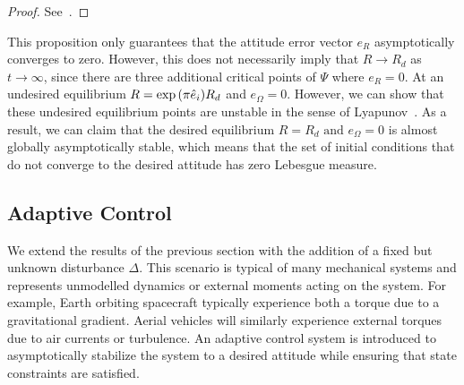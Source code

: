 \documentclass[letterpaper, 10 pt, conference]{ieeeconf}  %
\begin{document}
\begin{proof}
See~.
\end{proof}

This proposition only guarantees that the attitude error vector \( e_R \) asymptotically converges to zero.
However, this does not necessarily imply that \( R \to R_d \) as \( t \to \infty \), since there are three additional critical points of \( \Psi \) where \( e_R = 0 \).
At an undesired equilibrium \( R = \exp{ \ensuremath{\left( \pi \hat{e}_i \right)}} R_d \) and \( e_\Omega =0 \).
However, we can show that these undesired equilibrium points are unstable in the sense of Lyapunov~\cite{LeeITCST13}.
As a result, we can claim that the desired equilibrium \( R = R_d \text{ and } e_\Omega = 0 \) is almost globally asymptotically stable, which means that the set of initial conditions that do not converge to the desired attitude has zero Lebesgue measure.
 
\subsection{Adaptive Control}
We extend the results of the previous section with the addition of a fixed but unknown disturbance \( \Delta \).
This scenario is typical of many mechanical systems and represents unmodelled dynamics or external moments acting on the system.
For example, Earth orbiting spacecraft typically experience both a torque due to a gravitational gradient.
Aerial vehicles will similarly experience external torques due to air currents or turbulence.
An adaptive control system is introduced to asymptotically stabilize the system to a desired attitude while ensuring that state constraints are satisfied. %
\end{document}
